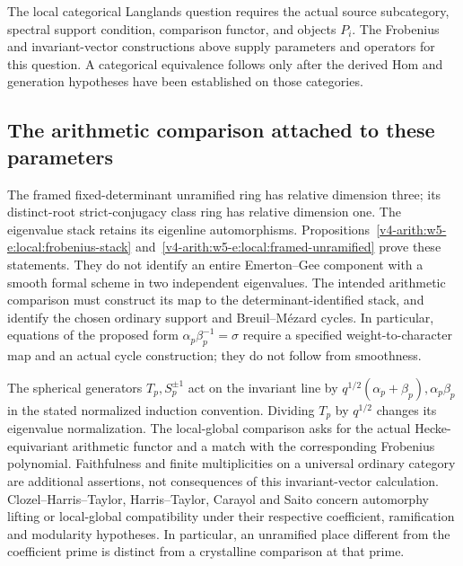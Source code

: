 The local categorical Langlands question requires the actual source
subcategory, spectral support condition, comparison functor, and
objects $P_i$. The Frobenius and invariant-vector constructions above
supply parameters and operators for this question. A categorical
equivalence follows only after the derived Hom and generation
hypotheses have been established on those categories.

\subsection{The arithmetic comparison attached to these parameters}
\begin{remark}
\label{v4-arith:w5-e:lem:unr-smooth}
The framed fixed-determinant unramified ring has relative dimension
three; its distinct-root strict-conjugacy class ring has relative dimension
one. The eigenvalue stack retains its eigenline automorphisms.
Propositions~\ref{v4-arith:w5-e:local:frobenius-stack}
and~\ref{v4-arith:w5-e:local:framed-unramified} prove these statements.
They do not identify an entire Emerton--Gee component with a smooth
formal scheme in two independent eigenvalues. The intended arithmetic
comparison must construct its map to the determinant-identified stack,
and identify the chosen ordinary support and Breuil--M\'{e}zard cycles.
In particular, equations of the proposed form
$\alpha_p\beta_p^{-1}=\sigma$ require a specified weight-to-character
map and an actual cycle construction; they do not follow from smoothness.
\end{remark}

\begin{remark}
\label{v4-arith:w5-e:lem:CHT-unr-Hecke}
The spherical generators $T_p,S_p^{\pm1}$ act on the invariant line
by $q^{1/2}(\alpha_p+\beta_p),\alpha_p\beta_p$ in the stated normalized
induction convention. Dividing $T_p$ by $q^{1/2}$ changes its eigenvalue
normalization. The local-global comparison asks for the actual
Hecke-equivariant arithmetic functor and a match with the corresponding
Frobenius polynomial. Faithfulness and finite multiplicities on a
universal ordinary category are additional assertions, not consequences
of this invariant-vector calculation. Clozel--Harris--Taylor,
Harris--Taylor, Carayol and Saito concern automorphy lifting or
local-global compatibility under their respective coefficient,
ramification and modularity hypotheses. In particular, an unramified
place different from the coefficient prime is distinct from a
crystalline comparison at that prime.
\end{remark}

